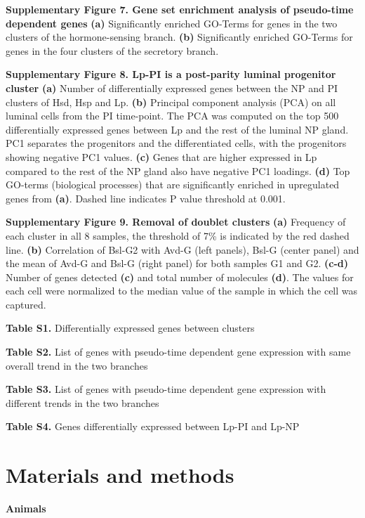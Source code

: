 \documentclass[titlepage, 12pt, oneside]{amsart}
\begin{document}
\textbf{Supplementary Figure 7. Gene set enrichment analysis of pseudo-time dependent genes}
\textbf{(a)} Significantly enriched GO-Terms for genes in the two clusters of the hormone-sensing branch.
\textbf{(b)} Significantly enriched GO-Terms for genes in the four clusters of the secretory branch.

\textbf{Supplementary Figure 8. Lp-PI is a post-parity luminal progenitor cluster}
\textbf{(a)} Number of differentially expressed genes between the NP and PI clusters of Hsd, Hsp and Lp.
\textbf{(b)} Principal component analysis (PCA) on all luminal cells from the PI time-point.
The PCA was computed on the top 500 differentially expressed genes between Lp and the rest of the luminal NP gland.
PC1 separates the progenitors and the differentiated cells, with the progenitors showing negative PC1 values.
\textbf{(c)} Genes that are higher expressed in Lp compared to the rest of the NP gland also have negative PC1 loadings.
\textbf{(d)} Top GO-terms (biological processes) that are significantly enriched in upregulated genes from \textbf{(a)}.
Dashed line indicates P value threshold at 0.001.

\textbf{Supplementary Figure 9. Removal of doublet clusters}
\textbf{(a)} Frequency of each cluster in all 8 samples, the threshold of 7\% is indicated by the red dashed line.
\textbf{(b)} Correlation of Bsl-G2 with Avd-G (left panels), Bsl-G (center panel) and the mean of Avd-G and Bsl-G (right panel) for both samples G1 and G2.
\textbf{(c-d)} Number of genes detected \textbf{(c)} and total number of molecules \textbf{(d)}. The values for each cell were normalized to the median value of the sample in which the cell was captured.

\textbf{Table S1.} Differentially expressed genes between clusters

\textbf{Table S2.} List of genes with pseudo-time dependent gene
expression with same overall trend in the two branches

\textbf{Table S3.} List of genes with pseudo-time dependent gene
expression with different trends in the two branches

\textbf{Table S4.} Genes differentially expressed between Lp-PI and Lp-NP

\section{Materials and methods}

\textbf{Animals}
\end{document}
